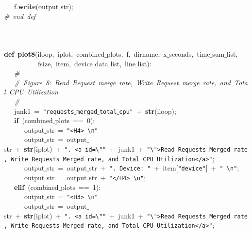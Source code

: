 \mbox{}\ \ \ f.\textbf{write}(output$\_$str); \\
\mbox{}\textit{\#\ end\ def} \\
\mbox{} \\
\mbox{} \\
\mbox{} \\
\mbox{}\textbf{def}\ \textbf{plot8}(iloop,\ iplot,\ combined$\_$plots,\ f,\ dirname,\ x$\_$seconds,\ time$\_$sum$\_$list, \\
\mbox{}\ \ \ \ \ \ \ \ \ \ fsize,\ item,\ device$\_$data$\_$list,\ line$\_$list): \\
\mbox{}\ \ \ \textit{\#} \\
\mbox{}\ \ \ \textit{\#\ Figure\ 8:\ Read\ Request\ merge\ rate,\ Write\ Request\ merge\ rate,\ and\ Total\ CPU\ Utilization} \\
\mbox{}\ \ \ \textit{\#} \\
\mbox{}\ \ \ junk1\ =\ \texttt{"{}requests$\_$merged$\_$total$\_$cpu"{}}\ +\ \textbf{str}(iloop); \\
\mbox{}\ \ \ \textbf{if}\ (combined$\_$plots\ ==\ 0): \\
\mbox{}\ \ \ \ \ \ output$\_$str\ =\ \texttt{"{}\textless{}H4\textgreater{}\ \textbackslash{}n"{}}\ \ \  \\
\mbox{}\ \ \ \ \ \ output$\_$str\ =\ output$\_$str\ +\ \textbf{str}(iplot)\ +\ \texttt{"{}.\ \textless{}a\ id=\textbackslash{}"{}"{}}\ +\ junk1\ +\ \texttt{"{}\textbackslash{}"{}\textgreater{}Read\ Requests\ Merged\ rate,\ Write\ Requests\ Merged\ rate,\ and\ Total\ CPU\ Utilization\textless{}/a\textgreater{}"{}}; \\
\mbox{}\ \ \ \ \ \ output$\_$str\ =\ output$\_$str\ +\ \texttt{"{}.\ Device:\ "{}}\ +\ item[\texttt{"{}device"{}}]\ +\ \texttt{"{}\ \textbackslash{}n"{}}; \\
\mbox{}\ \ \ \ \ \ output$\_$str\ =\ output$\_$str\ +\ \texttt{"{}\textless{}/H4\textgreater{}\ \textbackslash{}n"{}}; \\
\mbox{}\ \ \ \textbf{elif}\ (combined$\_$plots\ ==\ 1): \\
\mbox{}\ \ \ \ \ \ output$\_$str\ =\ \texttt{"{}\textless{}H3\textgreater{}\ \textbackslash{}n"{}}\ \ \  \\
\mbox{}\ \ \ \ \ \ output$\_$str\ =\ output$\_$str\ +\ \textbf{str}(iplot)\ +\ \texttt{"{}.\ \textless{}a\ id=\textbackslash{}"{}"{}}\ +\ junk1\ +\ \texttt{"{}\textbackslash{}"{}\textgreater{}Read\ Requests\ Merged\ rate,\ Write\ Requests\ Merged\ rate,\ and\ Total\ CPU\ Utilization\textless{}/a\textgreater{}"{}}; \\
